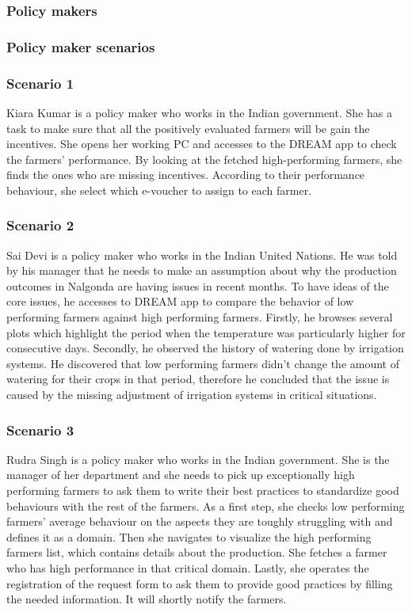 \subsubsection{Policy makers}
\subsubsection*{Policy maker scenarios}
\subsubsection*{Scenario 1}
Kiara Kumar is a policy maker who works in the Indian government. She has a task to make sure that all the positively evaluated farmers will be gain the incentives. She opens her working PC and accesses to the DREAM app to check the farmers' performance. By looking at the fetched high-performing farmers, she finds the ones who are missing incentives. According to their performance behaviour, she select which e-voucher to assign to each farmer.
\subsubsection*{Scenario 2}
Sai Devi is a policy maker who works in the Indian United Nations. He was told by his manager that he needs to make an assumption about why the production outcomes in Nalgonda are having issues in recent months. To have ideas of the core issues, he accesses to DREAM app to compare the behavior of low performing farmers against high performing farmers. Firstly, he browses several plots which highlight the period when the temperature was particularly higher for consecutive days. Secondly, he observed the history of watering done by irrigation systems. He discovered that low performing farmers didn't change the amount of watering for their crops in that period, therefore he concluded that the issue is caused by the missing adjustment of irrigation systems in critical situations.   
\subsubsection*{Scenario 3}
Rudra Singh is a policy maker who works in the Indian government. She is the manager of her department and she needs to pick up exceptionally high performing farmers to ask them to write their best practices to standardize good behaviours with the rest of the farmers. As a first step, she checks low performing farmers' average behaviour on the aspects they are toughly struggling with and defines it as a domain. Then she navigates to visualize the high performing farmers list, which contains details about the production. She fetches a farmer who has high performance in that critical domain. Lastly, she operates the registration of the request form to ask them to provide good practices by filling the needed information. It will shortly notify the farmers. 
